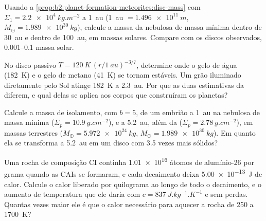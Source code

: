 \begin{exercise}[$\star\star$]\label{exo:b2:planet-formation-meteorites:5}
Usando a \cref{prop:b2:planet-formation-meteorites:disc-mass} com
$\Sigma_1 = \qty{2.2e4}{kg.m^{-2}}$ a \qty{1}{au} (\qty{1}{au} $=
\qty{1.496e11}{m}$, $M_\odot = \qty{1.989e30}{kg}$), calcule a massa da
nebulosa de massa mínima dentro de \qty{30}{au} e dentro de \qty{100}{au}, em massas
solares. Compare com os discos observados, \numrange{0.001}{0.1} massa solar.
\end{exercise}

\begin{exercise}[$\star\star$]\label{exo:b2:planet-formation-meteorites:6}
No disco passivo $T = \qty{120}{K}\,(r/\qty{1}{au})^{-3/7}$, determine onde o gelo de água
(\qty{182}{K}) e o gelo de metano (\qty{41}{K}) se tornam estáveis. Um grão iluminado
diretamente pelo Sol atinge \qty{182}{K} a \qty{2.3}{au}. Por que as duas estimativas da
 diferem, e qual delas se aplica aos corpos que construíram os planetas?
\end{exercise}

\begin{exercise}[$\star\star$]\label{exo:b2:planet-formation-meteorites:7}
Calcule a massa de isolamento, com $b = 5$, de um embrião a \qty{1}{au} na
nebulosa de massa mínima ($\Sigma_p = \qty{10.9}{g.cm^{-2}}$), e a \qty{5.2}{au},
além da  ($\Sigma_p = \qty{2.78}{g.cm^{-2}}$), em massas terrestres
($M_\oplus = \qty{5.972e24}{kg}$, $M_\odot = \qty{1.989e30}{kg}$). Em quanto ela
se transforma a \qty{5.2}{au} em um disco com \num{3.5} vezes mais sólidos?
\end{exercise}

\begin{exercise}[$\star\star$]\label{exo:b2:planet-formation-meteorites:8}
Uma rocha de composição CI continha \num{1.01e16} átomos de alumínio-26 por grama quando
as CAIs se formaram, e cada decaimento deixa \qty{5.00e-13}{J} de calor. Calcule o
calor liberado por quilograma ao longo de todo o decaimento, e o aumento de temperatura que ele
daria com $c = \qty{837}{J.kg^{-1}.K^{-1}}$ e sem perdas. Quantas vezes
maior ele é que o calor necessário para aquecer a rocha de \num{250} a
\qty{1700}{K}?
\end{exercise}

